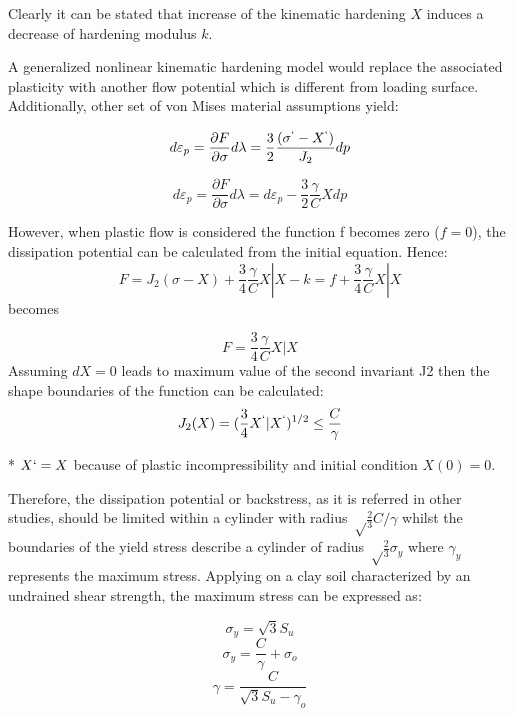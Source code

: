 \documentclass[11pt,a4paper]{report}
\begin{document}
Clearly it can be stated that increase of the kinematic hardening $X$ induces a decrease of hardening modulus $k$. 

A generalized nonlinear kinematic hardening model would replace the associated plasticity with another flow potential which is different from loading surface. Additionally, other set of von Mises material assumptions yield:

\begin{equation}
	d\varepsilon_p=\frac{\partial F}{\partial \sigma} d\lambda = \frac{3}{2} \frac{(\sigma^` - X^`)}{J_2} dp
\end{equation}

\begin{equation}
d\varepsilon_p=\frac{\partial F}{\partial \sigma} d\lambda = d\varepsilon_p - \frac{3}{2} \frac{\gamma}{C}X dp
\end{equation}

However, when plastic flow is considered the function f becomes zero ($f=0$), the dissipation potential can be calculated from the initial equation. Hence:
\begin{equation}
	F=J_2(\sigma - X)+ \frac{3}{4} \frac{\gamma}{C} X|X -k = f+\frac{3}{4} \frac{\gamma}{C}X|X
\end{equation}
becomes

\begin{equation}
	F=\frac{3}{4} \frac{\gamma}{C}X|X
\end{equation}
Assuming $dX=0$ leads to maximum value of the second invariant J2 then the shape boundaries of the function can be calculated:
\begin{equation}
	J_2(X)=(\frac{3}{4}X^`|X^`)^{1/2}\leq\frac{C}{\gamma}
\end{equation}

* $X`=X$ because of plastic incompressibility and initial condition $X(0)=0$.

Therefore, the dissipation potential or backstress, as it is referred in other studies, should be limited within a cylinder with radius $\sqrt\frac{2}{3} C/\gamma$ whilst the boundaries of the yield stress describe a cylinder of radius  $\sqrt\frac{2}{3}\sigma_y$ where $\gamma_y$ represents the maximum stress. Applying on a clay soil characterized by an undrained shear strength, the maximum stress can be expressed as:

\begin{equation}
\sigma_y=\sqrt{3}S_u
\end{equation}
\begin{equation}
\sigma_y = \frac{C}{\gamma}+\sigma_o
\end{equation}
\begin{equation}
\gamma = \frac{C}{\sqrt{3}S_u - \gamma_o}
\end{equation}
\end{document}
